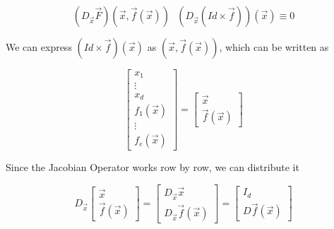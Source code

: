 \documentclass [12 pt, twoside] {book}
\newcommand\+{\text{ }}
\begin{document}
$$(D_{\vec{x}} \vec{F})(\vec{x}, \vec{f}(\vec{x})) \+ (D_{\vec{x}}(Id \times
\vec{f})) (\vec{x}) \equiv 0$$

We can express $(Id \times \vec{f})(\vec{x})$ as $(\vec{x}, \vec{f}(\vec{x}))$,
which can be written as

$$\left[\begin{array}{c}
        x_1 \\
        \vdots \\
        x_d \\
        f_1 (\vec{x})\\
        \vdots \\
        f_e (\vec{x})
\end{array}\right] =
\left[\begin{array}{c}
        \vec{x}\\
        \vec{f}(\vec{x})
\end{array}\right]$$

Since the Jacobian Operator works row by row, we can distribute it

$$D_{\vec{x}} \left[\begin{array}{c}
        \vec{x}\\
        \vec{f}(\vec{x})
\end{array}\right] =
\left[\begin{array}{c}
        D_{\vec{x}} \vec{x} \\
        D_{\vec{x}} \vec{f}(\vec{x})
\end{array}\right] =
\left[\begin{array}{c}
        I_d \\
        D \vec{f}(\vec{x})
\end{array}\right]$$
\end{document}
